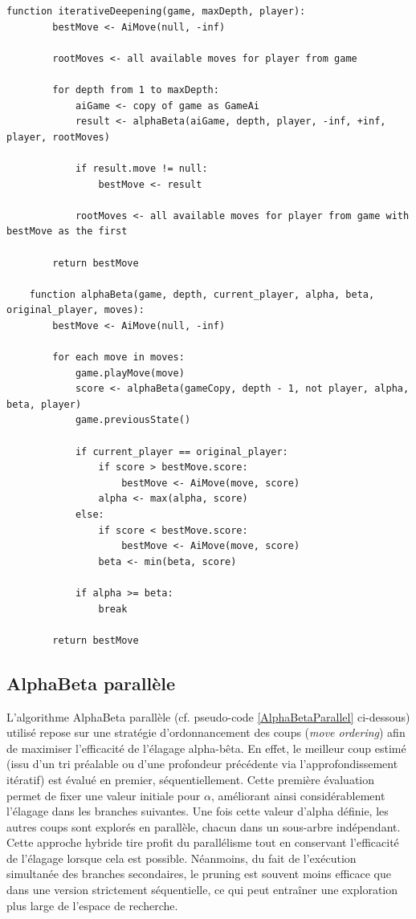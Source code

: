 \documentclass{article}
\begin{document}
\begin{lstlisting}[label={IterativeDeepening}, caption={Iterative Deepening avec AlphaBeta - pseudo-code}]
    function iterativeDeepening(game, maxDepth, player):
        bestMove <- AiMove(null, -inf)

        rootMoves <- all available moves for player from game
    
        for depth from 1 to maxDepth:
            aiGame <- copy of game as GameAi
            result <- alphaBeta(aiGame, depth, player, -inf, +inf, player, rootMoves)
    
            if result.move != null:
                bestMove <- result

            rootMoves <- all available moves for player from game with bestMove as the first
    
        return bestMove
    
    function alphaBeta(game, depth, current_player, alpha, beta, original_player, moves):
        bestMove <- AiMove(null, -inf)
    
        for each move in moves:
            game.playMove(move)
            score <- alphaBeta(gameCopy, depth - 1, not player, alpha, beta, player)
            game.previousState()

            if current_player == original_player:
                if score > bestMove.score:
                    bestMove <- AiMove(move, score)
                alpha <- max(alpha, score)
            else:
                if score < bestMove.score:
                    bestMove <- AiMove(move, score)
                beta <- min(beta, score)
    
            if alpha >= beta:
                break
    
        return bestMove
    \end{lstlisting}
    

\subsection{AlphaBeta parallèle}

L'algorithme AlphaBeta parallèle (cf. pseudo-code \ref{AlphaBetaParallel} ci-dessous) utilisé repose sur une stratégie d'ordonnancement des coups (\textit{move ordering}) afin de maximiser l'efficacité de l'élagage alpha-bêta. En effet, le meilleur coup estimé (issu d'un tri préalable ou d'une profondeur précédente via l'approfondissement itératif) est évalué en premier, séquentiellement. Cette première évaluation permet de fixer une valeur initiale pour $\alpha$, améliorant ainsi considérablement l'élagage dans les branches suivantes. Une fois cette valeur d'alpha définie, les autres coups sont explorés en parallèle, chacun dans un sous-arbre indépendant.
Cette approche hybride tire profit du parallélisme tout en conservant l'efficacité de l'élagage lorsque cela est possible. Néanmoins, du fait de l'exécution simultanée des branches secondaires, le pruning est souvent moins efficace que dans une version strictement séquentielle, ce qui peut entraîner une exploration plus large de l'espace de recherche.
\end{document}

